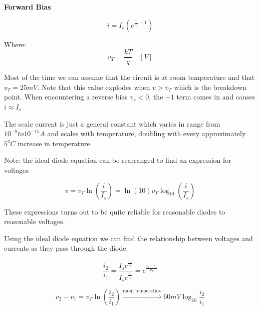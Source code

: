 \documentclass[10pt]{article}
\begin{document}
\begin{theorem}
	\textbf{Forward Bias} 

	\begin{equation}
		i = I_s(e^{\frac{v}{v_T} - 1})
		\label{eq:360:forward_bias}
	\end{equation}

	Where:
	\begin{equation}
		v_T = \frac{kT}{q} \quad [V]
	\end{equation}

	Most of the time we can assume that the circuit is at room temperature and that $ v_T = 25mV $.
	Note that this value explodes when $ v > v_T  $ which is the breakdown point.
	When encountering a reverse bias $ v_s < 0 $, the $ -1 $ term comes in and causes $ i \approx I_s  $  

	The scale current is just a general constant which varies in range from $ 10^{-9} to 10^{-15} A $ and scales with temperature, doubling with every approximately $ 5^o C $ increase in temperature.





	Note: the ideal diode equation can be rearranged to find an expression for voltages

	\begin{equation}
		v = v_T \ln{(\frac{i}{I_s}) = \ln{(10)} v_T \log_{10}{(\frac{i}{I_s})}}
		\label{eq:360:forward_bias_v}
	\end{equation}

	These expressions turns out to be quite reliable for reasonable diodes to reasonable voltages.

\end{theorem}

Using the ideal diode equation we can find the relationship between voltages and currents as they pass through the diode.


\begin{equation}
	\frac{i_2}{i_1} = \frac{I_s e^{\frac{v_2}{v_T}}}{I_s e^{\frac{v_1}{v_T}}} = e^{\frac{v_2 - v_1}{v_T}}
\end{equation}


\begin{equation}
	v_2 - v_1 = v_T \ln{(\frac{i_2}{i_1})} \xrightarrow{\text{room temperature}} 60mV \log_{10} \frac{i_2}{i_1}
\end{equation}
\end{document}
